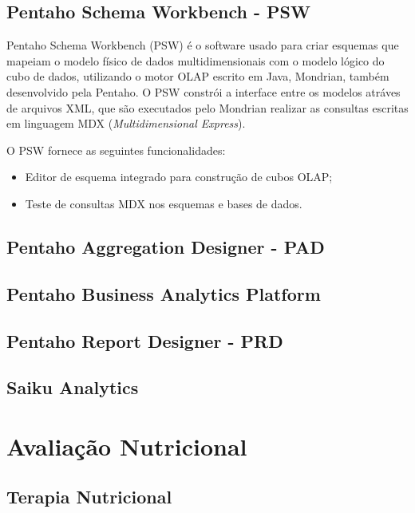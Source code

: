 \subsection{Pentaho Schema Workbench - PSW}
Pentaho Schema Workbench (PSW) é o software usado para criar esquemas que mapeiam o modelo físico de dados multidimensionais com o modelo lógico do cubo de dados, utilizando o motor OLAP escrito em Java, Mondrian, também desenvolvido pela Pentaho. O PSW constrói a interface entre os modelos atráves de arquivos XML, que são executados pelo Mondrian realizar as consultas escritas em linguagem MDX (\textit{Multidimensional Express}).

O PSW fornece as seguintes funcionalidades:

\begin{itemize}
    \item Editor de esquema integrado para construção de cubos OLAP;
    \item Teste de consultas MDX nos esquemas e bases de dados.
\end{itemize}

\subsection{Pentaho Aggregation Designer - PAD}
\subsection{Pentaho Business Analytics Platform}
\subsection{Pentaho Report Designer - PRD}
\subsection{Saiku Analytics}
\section{Avaliação Nutricional}

\subsection{Terapia Nutricional}
